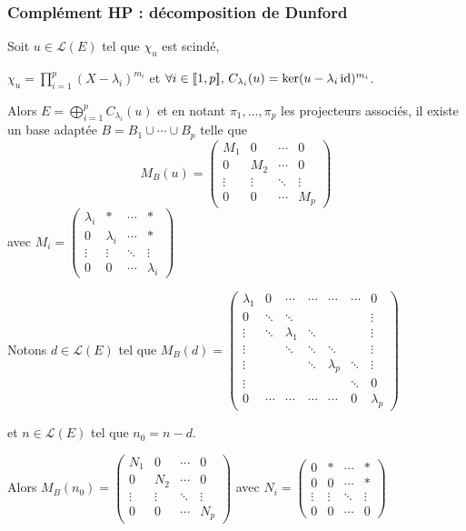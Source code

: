 \subsubsection{Complément HP : décomposition de Dunford }


Soit $u \in \mathscr L(E)$ tel que $\chi_u$ est scindé, 

$\chi_u = \displaystyle \prod_{i = 1 }^{ p } (X - \lambda_i)^{m_i}$ et 
$\forall i \in [\![1, p]\!], \, C_{\lambda_i}(u) = \ker (u - \lambda_i \operatorname{id})^{m_i}$.

Alors $E = \displaystyle \bigoplus_{i = 1 }^{ p } C_{\lambda_i}(u)$ et
en notant $\pi_1, \ldots, \pi_p$ les projecteurs associés, il existe un base adaptée $B = B_1 \cup \cdots \cup B_p$
telle que 
$$M_B(u) = \begin{pmatrix}
    M_1 & 0 & \cdots & 0 \\
    0 & M_2 & \cdots & 0 \\
    \vdots & \vdots & \ddots & \vdots \\
    0 & 0 & \cdots & M_p
\end{pmatrix}$$ avec $M_i = \begin{pmatrix}
    \lambda_i & * & \cdots & * \\
    0 & \lambda_i & \cdots & * \\
    \vdots & \vdots & \ddots & \vdots \\
    0 & 0 & \cdots & \lambda_i
\end{pmatrix}$

Notons $d \in \mathscr L(E)$ tel que $M_B(d) = \begin{pmatrix}
    \lambda_1 & 0 & \cdots & \cdots & \cdots & \cdots & 0 \\
    0 & \ddots & \ddots & & & & \vdots \\
    \vdots & \ddots & \lambda_1 & \ddots & & & \vdots \\
    \vdots & & \ddots & \ddots & \ddots &  & \vdots \\
    \vdots &  & & \ddots & \lambda_p &\ddots  & \vdots \\
    \vdots & &  & & & \ddots & 0 \\
    0 & \cdots & \cdots & \cdots & \cdots & 0 & \lambda_p        
\end{pmatrix}$ 

et $n \in \mathscr L(E)$ tel que $n_0 = n - d$. 

Alors $M_B(n_0) = \begin{pmatrix}
    N_1 & 0 & \cdots & 0 \\
    0 & N_2 & \cdots & 0 \\
    \vdots & \vdots & \ddots & \vdots \\
    0 & 0 & \cdots & N_p
\end{pmatrix}$ avec $N_i = \begin{pmatrix}
    0 & * & \cdots & * \\
    0 & 0 & \cdots & * \\
    \vdots & \vdots & \ddots & \vdots \\
    0 & 0 & \cdots & 0
\end{pmatrix}$

